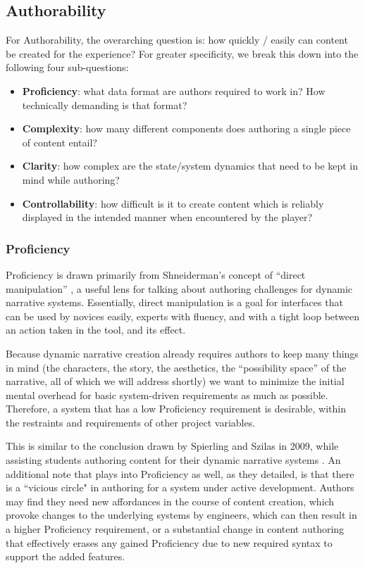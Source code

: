 \subsection{Authorability}

For Authorability, the overarching question is: how quickly / easily can content be created for the experience? For greater specificity, we break this down into the following four sub-questions:

\begin{itemize}
    \item \textbf{Proficiency}: what data format are authors required to work in? How technically demanding is that format?
    \item \textbf{Complexity}: how many different components does authoring a single piece of content entail?
    \item \textbf{Clarity}: how complex are the state/system dynamics that need to be kept in mind while authoring?
    \item \textbf{Controllability}: how difficult is it to create content which is reliably displayed in the intended manner when encountered by the player?
\end{itemize}

\subsubsection{Proficiency}

Proficiency is drawn primarily from Shneiderman's concept of ``direct manipulation'' \cite{shneiderman}, a useful lens for talking about authoring challenges for dynamic narrative systems. Essentially, direct manipulation is a goal for interfaces that can be used by novices easily, experts with fluency, and with a tight loop between an action taken in the tool, and its effect. 

Because dynamic narrative creation already requires authors to keep many things in mind (the characters, the story, the aesthetics, the ``possibility space'' of the narrative, all of which we will address shortly) we want to minimize the initial mental overhead for basic system-driven requirements as much as possible. Therefore, a system that has a low Proficiency requirement is desirable, within the restraints and requirements of other project variables. 

This is similar to the conclusion drawn by Spierling and Szilas in 2009, while assisting students authoring content for their dynamic narrative systems \cite{authoring_issues}. An additional note that plays into Proficiency as well, as they detailed, is that there is a ``vicious circle" in authoring for a system under active development. Authors may find they need new affordances in the course of content creation, which provoke changes to the underlying systems by engineers, which can then result in a higher Proficiency requirement, or a substantial change in content authoring that effectively erases any gained Proficiency due to new required syntax to support the added features.

